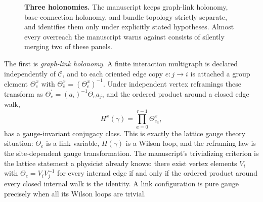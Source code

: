 \documentclass[11pt,letterpaper]{article}
\begin{document}
\begin{figure}[ht]
{}
\caption{\textbf{Three holonomies.} The manuscript keeps graph-link holonomy, base-connection holonomy, and bundle topology strictly separate, and identifies them only under explicitly stated hypotheses. Almost every overreach the manuscript warns against consists of silently merging two of these panels.}
\label{fig:holonomy}
\end{figure}

The first is \emph{graph-link holonomy}. A finite interaction multigraph is declared independently of \(\mathcal C\), and to each oriented edge copy \(e:j\to i\) is attached a group element \(\Theta_e^x\) with \(\Theta_{\bar e}^x=(\Theta_e^x)^{-1}\). Under independent vertex reframings these transform as \(\Theta_e^{\prime}=(a_i)^{-1}\Theta_e a_j\), and the ordered product around a closed edge walk,
\begin{equation}
  H^x(\gamma)=\prod_{a=0}^{r-1}\Theta_{e_a}^x,
  \label{eq:graph-holonomy}
\end{equation}
has a gauge-invariant conjugacy class. This is exactly the lattice gauge theory situation: \(\Theta_e\) is a link variable, \(H(\gamma)\) is a Wilson loop, and the reframing law is the site-dependent gauge transformation. The manuscript's trivializing criterion is the lattice statement a physicist already knows: there exist vertex elements \(V_i\) with \(\Theta_e=V_iV_j^{-1}\) for every internal edge if and only if the ordered product around every closed internal walk is the identity. A link configuration is pure gauge precisely when all its Wilson loops are trivial.
\end{document}
